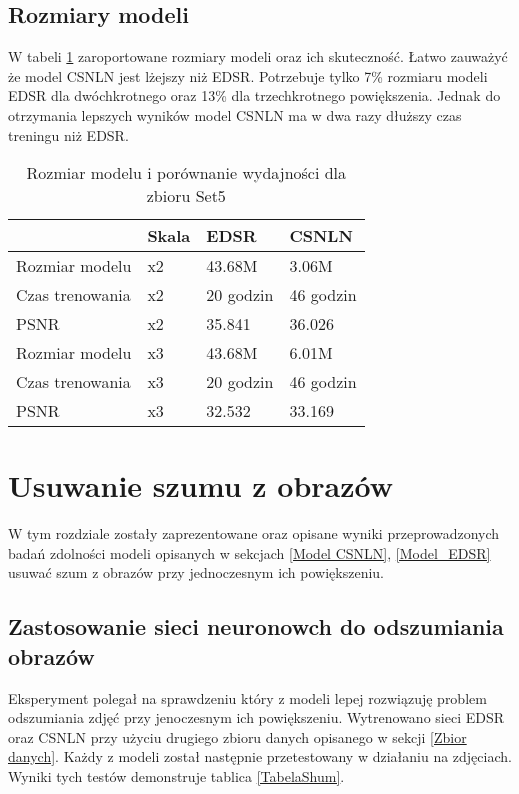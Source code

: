 \documentclass[a4paper,12pt,twoside,openany]{report}
\begin{document}
\section{Rozmiary modeli}
W tabeli \ref{TabelaSizeOfModels} zaroportowane rozmiary modeli oraz ich skuteczność. Łatwo zauważyć że model CSNLN jest lżejszy niż EDSR. Potrzebuje tylko 7\% rozmiaru modeli EDSR dla  dwóchkrotnego  oraz 13\% dla trzechkrotnego powiększenia. Jednak do otrzymania lepszych wyników model CSNLN ma w dwa razy dłuższy czas treningu niż EDSR. 
\begin{table}[!htbp] 
	\centering
	\begin{tabular}{ |p{5cm}||p{1cm}|p{2cm}|p{2cm}|  }
		\hline
		& Skala & EDSR &  CSNLN \\
		\hline		
		Rozmiar modelu                            &   x2  &  43.68M    &  3.06M \\
		Czas trenowania							  &   x2  &  20 godzin &  46 godzin\\
		PSNR								      &   x2  &  35.841    &  36.026\\
		\hline
		Rozmiar modelu                            &   x3  &  43.68M    &   6.01M\\
		Czas trenowania							  &   x3  &  20 godzin &  46 godzin\\
		PSNR								      &   x3  &  32.532    &  33.169\\
		\hline
		
	\end{tabular}
	\caption{Rozmiar modelu i porównanie wydajności dla zbioru Set5}
	\label{TabelaSizeOfModels}
\end{table}

\newpage
\chapter{Usuwanie szumu z obrazów}
W tym rozdziale zostały zaprezentowane oraz opisane wyniki przeprowadzonych badań zdolności modeli opisanych w sekcjach \ref{Model CSNLN}, \ref{Model_EDSR} usuwać szum z obrazów przy jednoczesnym ich powiększeniu.
\section{Zastosowanie sieci neuronowch do odszumiania obrazów}
  
Eksperyment polegał na sprawdzeniu który z  modeli lepej rozwiązuję problem odszumiania zdjęć przy jenoczesnym ich  powiększeniu. Wytrenowano sieci EDSR oraz CSNLN przy użyciu drugiego zbioru danych opisanego w sekcji \ref{Zbior danych}. Każdy z modeli został następnie przetestowany w działaniu na zdjęciach. Wyniki tych testów demonstruje tablica \ref{TabelaShum}.
\end{document}

